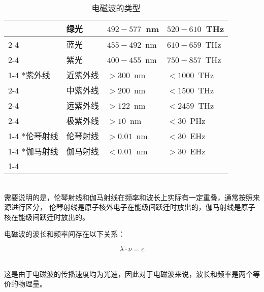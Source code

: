 \documentclass[UTF8]{ctexart}
\begin{document}
\begin{table}[h]
\begin{center}
\begin{tabular}{l|l|l|l}
                &绿光&$492-577$~nm&$520-610$~THz\\ \cline{2-4}
                &蓝光&$455-492$~nm&$610-659$~THz\\ \cline{2-4}
                &紫光&$400-455$~nm&$750-857$~THz\\ \cline{1-4}
                \multirow{4}*{紫外线}
                &近紫外线&$>300$~nm&$<1000$~THz\\ \cline{2-4}
                &中紫外线&$>200$~nm&$<1500$~THz\\ \cline{2-4}
                &远紫外线&$>122$~nm&$<2459$~THz\\ \cline{2-4}
                &极紫外线&$>10$~nm&$<30$~PHz\\ \cline{1-4}
                \multirow{1}*{伦琴射线}
                &伦琴射线&$>0.01$~nm&$<30$~EHz\\ \cline{1-4}
                \multirow{1}*{伽马射线}
                &伽马射线&$<0.01$~nm&$>30$~EHz\\ \cline{1-4}
            \end{tabular}
            \caption{电磁波的类型}
        \end{center}
    \end{table}\\
    需要说明的是，伦琴射线和伽马射线在频率和波长上实际有一定重叠，通常按照来源进行区分，
    伦琴射线是原子核外电子在能级间跃迁时放出的，伽马射线是原子核在能级间跃迁时放出的。

\newpage

    电磁波的波长和频率间存在以下关系：
    \begin{large}
        \begin{equation*}
            \lambda\cdot\nu=c
        \end{equation*}
    \end{large}\\
    这是由于电磁波的传播速度均为光速，因此对于电磁波来说，波长和频率是两个等价的物理量。\\
\end{document}
